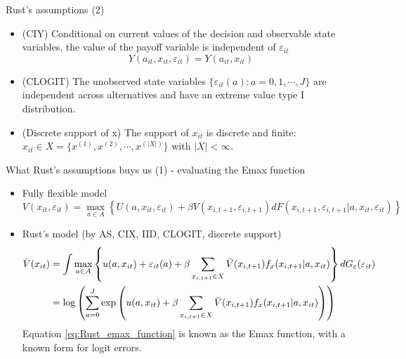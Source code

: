 \documentclass[aspectratio=169]{beamer}
\begin{document}
	\begin{frame}{Rust's assumptions (2)}
		\begin{itemize}
			\itemsep1em
			\item (CIY) Conditional on current values of the decision and observable state variables, the value of the payoff variable is independent of $\varepsilon_{it}$
			$$Y(a_{it},x_{it},\varepsilon_{it}) = Y(a_{it},x_{it})$$
			\item (CLOGIT) The unobserved state variables $\{\varepsilon_{it}(a): a = 0,1,\cdots,J\}$ are independent across alternatives and have an extreme value type I distribution.
			\item (Discrete support of x) The support of $x_{it}$ is discrete and finite: $x_{it} \in X = \{x^{(1)},x^{(2)},\cdots,x^{(|X|)}\}$ with $|X| < \infty$.
		\end{itemize}
	\end{frame}
	
	\begin{frame}{What Rust's assumptions buys us (1) - evaluating the Emax function}
		\begin{itemize}
			\itemsep1em
			\item Fully flexible model
			$$ V(x_{it},\varepsilon_{it}) = \max_{a \in A} \left\{ U(a,x_{it},\varepsilon_{it}) + \beta V(x_{i,t+1},\varepsilon_{i,t+1}) dF(x_{i,t+1},\varepsilon_{i,t+1}|a,x_{it},\varepsilon_{it}) \right\}$$
			\item Rust's model (by AS, CIX, IID, CLOGIT, discrete support)
			\begin{align}
				\Bar{V}(x_{it}) &= \int \max_{a \in A} \left\{ u(a,x_{it}) + \varepsilon_{it}(a) + \beta \sum_{x_{i,t+1} \in X} \Bar{V}(x_{i,t+1})f_x(x_{i,t+1}|a,x_{it}) \right\} dG_\varepsilon(\varepsilon_{it})       \label{eq:Rust_emax_function} \\    
				&= \log \left( \sum_{a=0}^J \exp \left(u(a,x_{it}) + \beta \sum_{x_{i,t+1} \in X} \Bar{V}(x_{i,t+1})f_x(x_{i,t+1}|a,x_{it}) \right)\right)
			\end{align}
			Equation \ref{eq:Rust_emax_function} is known as the Emax function, with a known form for logit errors.
		\end{itemize}
	\end{frame}
	
\end{document}
